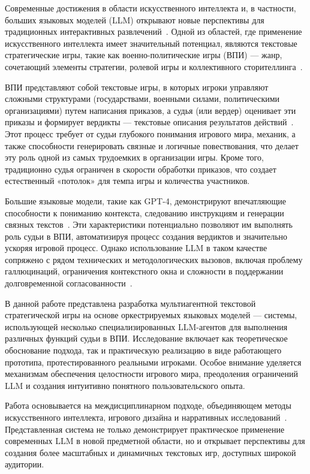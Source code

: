 Современные достижения в области искусственного интеллекта и, в частности, больших языковых моделей (LLM) открывают новые перспективы для традиционных интерактивных развлечений~\cite{brown2020language, ouyang2022training}. Одной из областей, где применение искусственного интеллекта имеет значительный потенциал, являются текстовые стратегические игры, такие как военно-политические игры (ВПИ) — жанр, сочетающий элементы стратегии, ролевой игры и коллективного сторителлинга~\cite{catalogwpg2023}.

ВПИ представляют собой текстовые игры, в которых игроки управляют сложными структурами (государствами, военными силами, политическими организациями) путем написания приказов, а судья (или вердер) оценивает эти приказы и формирует вердикты — текстовые описания результатов действий~\cite{wpg-definition}. Этот процесс требует от судьи глубокого понимания игрового мира, механик, а также способности генерировать связные и логичные повествования, что делает эту роль одной из самых трудоемких в организации игры. Кроме того, традиционно судья ограничен в скорости обработки приказов, что создает естественный «потолок» для темпа игры и количества участников.

Большие языковые модели, такие как GPT-4, демонстрируют впечатляющие способности к пониманию контекста, следованию инструкциям и генерации связных текстов~\cite{openai2023gpt4}. Эти характеристики потенциально позволяют им выполнять роль судьи в ВПИ, автоматизируя процесс создания вердиктов и значительно ускоряя игровой процесс. Однако использование LLM в таком качестве сопряжено с рядом технических и методологических вызовов, включая проблему галлюцинаций, ограничения контекстного окна и сложности в поддержании долговременной согласованности~\cite{bubeck2023sparks, liu2023evaluating}.

В данной работе представлена разработка мультиагентной текстовой стратегической игры на основе оркестрируемых языковых моделей — системы, использующей несколько специализированных LLM-агентов для выполнения различных функций судьи в ВПИ. Исследование включает как теоретическое обоснование подхода, так и практическую реализацию в виде работающего прототипа, протестированного реальными игроками. Особое внимание уделяется механизмам обеспечения целостности игрового мира, преодоления ограничений LLM и создания интуитивно понятного пользовательского опыта.

Работа основывается на междисциплинарном подходе, объединяющем методы искусственного интеллекта, игрового дизайна и нарративных исследований~\cite{yuan2022wordcraft, park2023generative}. Представленная система не только демонстрирует практическое применение современных LLM в новой предметной области, но и открывает перспективы для создания более масштабных и динамичных текстовых игр, доступных широкой аудитории.

